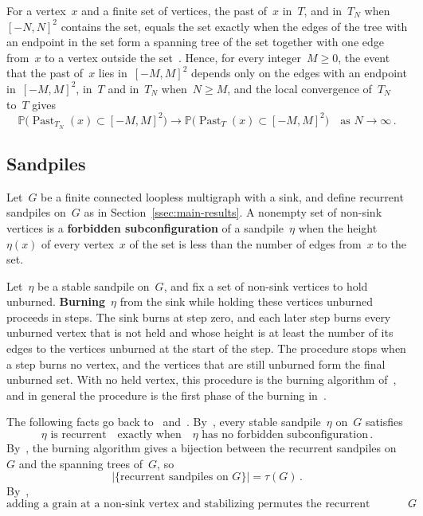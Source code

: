 \documentclass[11pt]{amsart}
\numberwithin{equation}{section}
\newcommand{\PP}{\mathbb P}
\begin{document}
For a vertex~$x$ and a finite set of vertices, the past of~$x$ in~$T$, and in~$T_N$ when~$[-N,N]^2$ contains the set, equals the set exactly when the edges of the tree with an endpoint in the set form a spanning tree of the set together with one edge from~$x$ to a vertex outside the set~\citep[proof of Claim~1 of the electronic supplement]{AthreyaJarai2006}. Hence, for every integer~$M\geq0$, the event that the past of~$x$ lies in~$[-M,M]^2$ depends only on the edges with an endpoint in~$[-M,M]^2$, in~$T$ and in~$T_N$ when~$N\geq M$, and the local convergence of~$T_N$ to~$T$ gives
\begin{equation}\label{pre:past-limit}
\PP\bigl(\operatorname{Past}_{T_N}(x)\subset [-M,M]^2\bigr)\to\PP\bigl(\operatorname{Past}_T(x)\subset [-M,M]^2\bigr)\quad\text{as }N\to\infty\,.
\end{equation}

\subsection{Sandpiles}\label{ssec:prelim-sandpiles}

Let~$G$ be a finite connected loopless multigraph with a sink, and define recurrent sandpiles on~$G$ as in Section~\ref{ssec:main-results}. A nonempty set of non-sink vertices is a \textbf{forbidden subconfiguration} of a sandpile~$\eta$ when the height~$\eta(x)$ of every vertex~$x$ of the set is less than the number of edges from~$x$ to the set.

Let~$\eta$ be a stable sandpile on~$G$, and fix a set of non-sink vertices to hold unburned. \textbf{Burning}~$\eta$ from the sink while holding these vertices unburned proceeds in steps. The sink burns at step zero, and each later step burns every unburned vertex that is not held and whose height is at least the number of its edges to the vertices unburned at the start of the step. The procedure stops when a step burns no vertex, and the vertices that are still unburned form the final unburned set. With no held vertex, this procedure is the burning algorithm of~\citet[Section~4.1]{Jarai2018}, and in general the procedure is the first phase of the burning in~\citet[Section~3.1]{JaraiWerning2014}.

The following facts go back to~\citet{Dhar1990} and~\citet{MajumdarDhar1992}. By~\citet[Exercise~4.5]{Jarai2018}, every stable sandpile~$\eta$ on~$G$ satisfies
\begin{equation}\label{pre:burning}
\eta\text{ is recurrent}\quad\text{exactly when}\quad\eta\text{ has no forbidden subconfiguration}\,.
\end{equation}
By~\citet[Corollary~4.4]{Jarai2018}, the burning algorithm gives a bijection between the recurrent sandpiles on~$G$ and the spanning trees of~$G$, so
\begin{equation}\label{pre:count}
\bigl|\{\text{recurrent sandpiles on }G\}\bigr|=\tau(G)\,.
\end{equation}
By~\citet[Theorem~2.11 and Section~2.3]{Jarai2018},
\begin{equation}\label{pre:permutation}
\text{adding a grain at a non-sink vertex and stabilizing permutes the recurrent sandpiles on~$G$}\,.
\end{equation}
\end{document}
